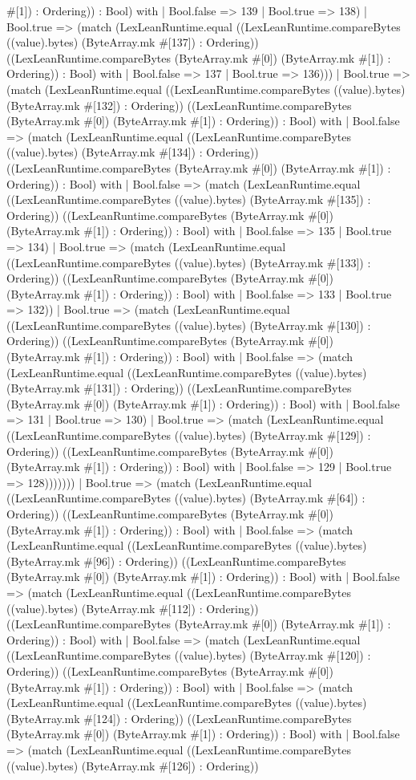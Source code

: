 \documentclass[11pt]{article}
\begin{document}
\#[1]) : Ordering)) : Bool) with | Bool.false => 139 | Bool.true => 138) | Bool.true => (match (LexLeanRuntime.equal ((LexLeanRuntime.compareBytes ((value).bytes) (ByteArray.mk \#[137]) : Ordering)) ((LexLeanRuntime.compareBytes (ByteArray.mk \#[0]) (ByteArray.mk \#[1]) : Ordering)) : Bool) with | Bool.false => 137 | Bool.true => 136))) | Bool.true => (match (LexLeanRuntime.equal ((LexLeanRuntime.compareBytes ((value).bytes) (ByteArray.mk \#[132]) : Ordering)) ((LexLeanRuntime.compareBytes (ByteArray.mk \#[0]) (ByteArray.mk \#[1]) : Ordering)) : Bool) with | Bool.false => (match (LexLeanRuntime.equal ((LexLeanRuntime.compareBytes ((value).bytes) (ByteArray.mk \#[134]) : Ordering)) ((LexLeanRuntime.compareBytes (ByteArray.mk \#[0]) (ByteArray.mk \#[1]) : Ordering)) : Bool) with | Bool.false => (match (LexLeanRuntime.equal ((LexLeanRuntime.compareBytes ((value).bytes) (ByteArray.mk \#[135]) : Ordering)) ((LexLeanRuntime.compareBytes (ByteArray.mk \#[0]) (ByteArray.mk \#[1]) : Ordering)) : Bool) with | Bool.false => 135 | Bool.true => 134) | Bool.true => (match (LexLeanRuntime.equal ((LexLeanRuntime.compareBytes ((value).bytes) (ByteArray.mk \#[133]) : Ordering)) ((LexLeanRuntime.compareBytes (ByteArray.mk \#[0]) (ByteArray.mk \#[1]) : Ordering)) : Bool) with | Bool.false => 133 | Bool.true => 132)) | Bool.true => (match (LexLeanRuntime.equal ((LexLeanRuntime.compareBytes ((value).bytes) (ByteArray.mk \#[130]) : Ordering)) ((LexLeanRuntime.compareBytes (ByteArray.mk \#[0]) (ByteArray.mk \#[1]) : Ordering)) : Bool) with | Bool.false => (match (LexLeanRuntime.equal ((LexLeanRuntime.compareBytes ((value).bytes) (ByteArray.mk \#[131]) : Ordering)) ((LexLeanRuntime.compareBytes (ByteArray.mk \#[0]) (ByteArray.mk \#[1]) : Ordering)) : Bool) with | Bool.false => 131 | Bool.true => 130) | Bool.true => (match (LexLeanRuntime.equal ((LexLeanRuntime.compareBytes ((value).bytes) (ByteArray.mk \#[129]) : Ordering)) ((LexLeanRuntime.compareBytes (ByteArray.mk \#[0]) (ByteArray.mk \#[1]) : Ordering)) : Bool) with | Bool.false => 129 | Bool.true => 128))))))) | Bool.true => (match (LexLeanRuntime.equal ((LexLeanRuntime.compareBytes ((value).bytes) (ByteArray.mk \#[64]) : Ordering)) ((LexLeanRuntime.compareBytes (ByteArray.mk \#[0]) (ByteArray.mk \#[1]) : Ordering)) : Bool) with | Bool.false => (match (LexLeanRuntime.equal ((LexLeanRuntime.compareBytes ((value).bytes) (ByteArray.mk \#[96]) : Ordering)) ((LexLeanRuntime.compareBytes (ByteArray.mk \#[0]) (ByteArray.mk \#[1]) : Ordering)) : Bool) with | Bool.false => (match (LexLeanRuntime.equal ((LexLeanRuntime.compareBytes ((value).bytes) (ByteArray.mk \#[112]) : Ordering)) ((LexLeanRuntime.compareBytes (ByteArray.mk \#[0]) (ByteArray.mk \#[1]) : Ordering)) : Bool) with | Bool.false => (match (LexLeanRuntime.equal ((LexLeanRuntime.compareBytes ((value).bytes) (ByteArray.mk \#[120]) : Ordering)) ((LexLeanRuntime.compareBytes (ByteArray.mk \#[0]) (ByteArray.mk \#[1]) : Ordering)) : Bool) with | Bool.false => (match (LexLeanRuntime.equal ((LexLeanRuntime.compareBytes ((value).bytes) (ByteArray.mk \#[124]) : Ordering)) ((LexLeanRuntime.compareBytes (ByteArray.mk \#[0]) (ByteArray.mk \#[1]) : Ordering)) : Bool) with | Bool.false => (match (LexLeanRuntime.equal ((LexLeanRuntime.compareBytes ((value).bytes) (ByteArray.mk \#[126]) : Ordering)) 
\end{document}
